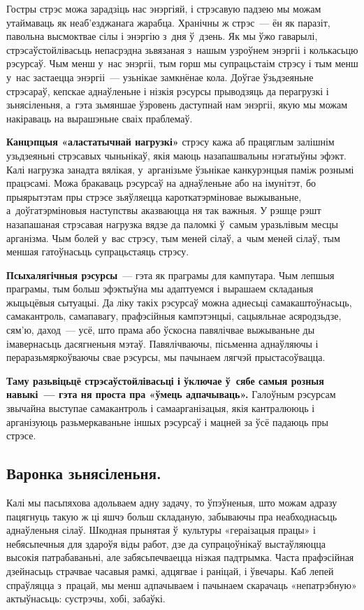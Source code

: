 Гостры стрэс можа зарадзіць нас энэргіяй, і стрэсавую падзею мы можам утаймаваць як неаб'езджанага жарабца. Хранічны ж стрэс~--- ён як паразіт, павольна высмоктвае сілы і энэргію з~дня ў~дзень. Як мы ўжо гаварылі, стрэсаўстойлівасьць непасрэдна зьвязаная з~нашым узроўнем энэргіі і колькасьцю рэсурсаў. Чым менш у~нас энэргіі, тым горш мы супрацьстаім стрэсу і тым менш у~нас застаецца энэргіі~--- узьнікае замкнёнае кола. Доўгае ўзьдзеяньне стрэсараў, кепскае аднаўленьне і нізкія рэсурсы прыводзяць да перагрузкі і зьнясіленьня, а~гэта зьмяншае ўзровень даступнай нам энэргіі, якую мы можам накіраваць на вырашэньне сваіх праблемаў. 


\textbf{Канцэпцыя «аластатычнай нагрузкі»} стрэсу кажа аб працяглым залішнім узьдзеяньні стрэсавых чыньнікаў, якія маюць назапашвальны нэгатыўны эфэкт. Калі нагрузка занадта вялікая, у~арганізьме ўзьнікае канкурэнцыя паміж рознымі працэсамі. Можа бракаваць рэсурсаў на аднаўленьне або на імунітэт, бо прыярытэтам пры стрэсе зьяўляецца кароткатэрміновае выжываньне, а~доўгатэрміновыя наступствы аказваюцца ня так важныя. У рэшце рэшт назапашаная стрэсавая нагрузка вядзе да паломкі ў~самым уразьлівым месцы арганізма. Чым болей у~вас стрэсу, тым меней сілаў, а~чым меней сілаў, тым меншая гатоўнасьць супрацьстаяць стрэсу.

\textbf{Псыхалягічныя рэсурсы}~--- гэта як праграмы для кампутара. Чым лепшыя праграмы, тым больш эфэктыўна мы адаптуемся і вырашаем складаныя жыцьцёвыя сытуацыі. Да ліку такіх рэсурсаў можна аднесьці самакаштоўнасьць, самакантроль, самапавагу, прафэсійныя кампэтэнцыі, сацыяльнае асяродзьдзе, сям'ю, даход~--- усё, што прама або ўскосна павялічвае выжываньне ды імавернасьць дасягненьня мэтаў. Павялічваючы, пісьменна аднаўляючы і пераразьмяркоўваючы свае рэсурсы, мы пачынаем лягчэй прыстасоўвацца. 

\textbf{Таму разьвіцьцё стрэсаўстойлівасьці і ўключае ў~сябе самыя розныя навыкі~--- гэта ня проста пра «ўмець адпачываць».} Галоўным рэсурсам звычайна выступае самакантроль і самаарганізацыя, якія кантралююць і арганізуюць разьмеркаваньне іншых рэсурсаў і мацней за ўсё падаюць пры стрэсе.

\subsection*{Варонка зьнясіленьня.} Калі мы пасьпяхова адольваем адну задачу, то ўпэўненыя, што можам адразу пацягнуць такую ж ці яшчэ больш складаную, забываючы пра неабходнасьць аднаўленьня сілаў. Шкодная прынятая ў~культуры «гераізацыя працы» і небясьпечныя для здароўя віды работ, дзе да супрацоўнікаў выстаўляюцца высокія патрабаваньні, але забясьпечваецца нізкая падтрымка. Часта прафэсійная дзейнасьць страчвае часавыя рамкі, адцягвае і раніцай, і ўвечары. Каб лепей спраўляцца з~працай, мы менш адпачываем і пачынаем скарачаць «непатрэбную» актыўнасьць: сустрэчы, хобі, забаўкі. 


